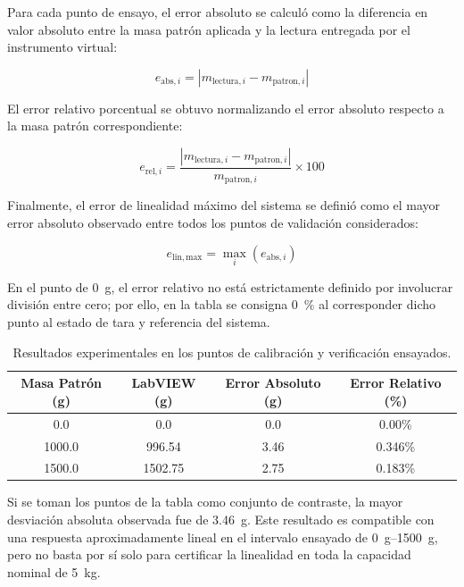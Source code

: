Para cada punto de ensayo, el error absoluto se calculó como la diferencia en valor absoluto entre la masa patrón aplicada y la lectura entregada por el instrumento virtual:

\[
    e_{\mathrm{abs},i} = \left| m_{\mathrm{lectura},i} - m_{\mathrm{patron},i} \right|
\]

El error relativo porcentual se obtuvo normalizando el error absoluto respecto a la masa patrón correspondiente:

\[
    e_{\mathrm{rel},i} = \frac{\left| m_{\mathrm{lectura},i} - m_{\mathrm{patron},i} \right|}{m_{\mathrm{patron},i}} \times 100
\]

Finalmente, el error de linealidad máximo del sistema se definió como el mayor error absoluto observado entre todos los puntos de validación considerados:

\[
    e_{\mathrm{lin,max}} = \max_i \left( e_{\mathrm{abs},i} \right)
\]

En el punto de \SI{0}{\g}, el error relativo no está estrictamente definido por involucrar división entre cero; por ello, en la tabla se consigna \SI{0}{\percent} al corresponder dicho punto al estado de tara y referencia del sistema.



\begin{table}[H]
    \centering
    \caption{Resultados experimentales en los puntos de calibración y verificación ensayados.}
    \label{tab:linealidad}
    \begin{tabular}{cccc}
        \hline
        \textbf{Masa Patrón (g)} & \textbf{LabVIEW (g)} & \textbf{Error Absoluto (g)} & \textbf{Error Relativo (\%)} \\ \hline
        0.0                      & 0.0                  & 0.0                         & 0.00\%                       \\
        1000.0                   & 996.54               & 3.46                        & 0.346\%                      \\
        1500.0                   & 1502.75              & 2.75                        & 0.183\%                      \\ \hline
    \end{tabular}
\end{table}

Si se toman los puntos de la tabla como conjunto de contraste, la mayor desviación absoluta observada fue de \SI{3.46}{\g}. Este resultado es compatible con una respuesta aproximadamente lineal en el intervalo ensayado de \SIrange{0}{1500}{\g}, pero no basta por sí solo para certificar la linealidad en toda la capacidad nominal de \SI{5}{\kg}.

